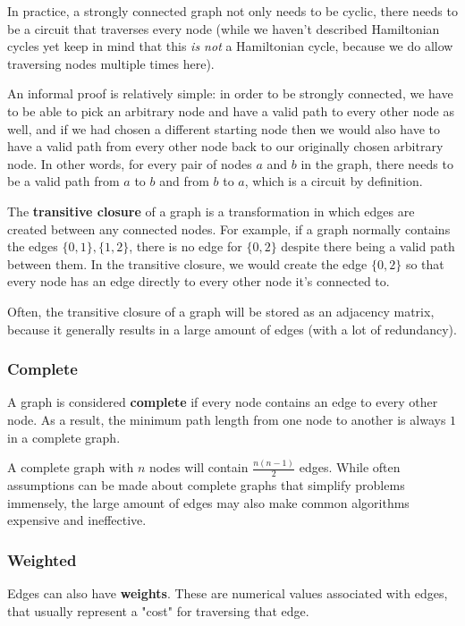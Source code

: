In practice, a strongly connected graph not only needs to be cyclic, there needs to be a circuit that traverses every node (while we haven't described Hamiltonian cycles yet keep in mind that this \textit{is not} a Hamiltonian cycle, because we do allow traversing nodes multiple times here).

An informal proof is relatively simple: in order to be strongly connected, we have to be able to pick an arbitrary node and have a valid path to every other node as well, and if we had chosen a different starting node then we would also have to have a valid path from every other node back to our originally chosen arbitrary node. In other words, for every pair of nodes $a$ and $b$ in the graph, there needs to be a valid path from $a$ to $b$ and from $b$ to $a$, which is a circuit by definition.

The \textbf{transitive closure}  of a graph is a transformation in which edges are created between any connected nodes. For example, if a graph normally contains the edges $\{0,1\},\{1,2\}$, there is no edge for $\{0,2\}$ despite there being a valid path between them. In the transitive closure, we would create the edge $\{0,2\}$ so that every node has an edge directly to every other node it's connected to.

Often, the transitive closure of a graph will be stored as an adjacency matrix, because it generally results in a large amount of edges (with a lot of redundancy).

\subsubsection{Complete}

A graph is considered \textbf{complete} if every node contains an edge to every other node. As a result, the minimum path length from one node to another is always $1$ in a complete graph.

A complete graph with $n$ nodes will contain $\frac{n(n-1)}{2}$ edges. While often assumptions can be made about complete graphs that simplify problems immensely, the large amount of edges may also make common algorithms expensive and ineffective.

\subsubsection{Weighted}
 

Edges can also have \textbf{weights}. These are numerical values associated with edges, that usually represent a "cost" for traversing that edge. 

